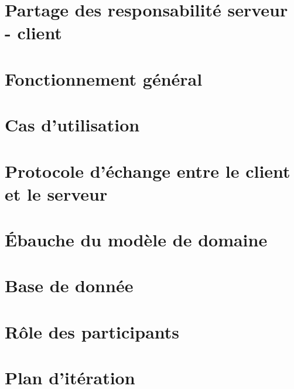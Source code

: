 \documentclass[a4paper,11pt]{article}
\begin{document}
	\section{Partage des responsabilité serveur - client}

	\section{Fonctionnement général}

	\section{Cas d'utilisation}

	\section{Protocole d'échange entre le client et le serveur}

	\section{Ébauche du modèle de domaine}

	\section{Base de donnée}

	\section{Rôle des participants}

	\section{Plan d'itération}
\end{document}

